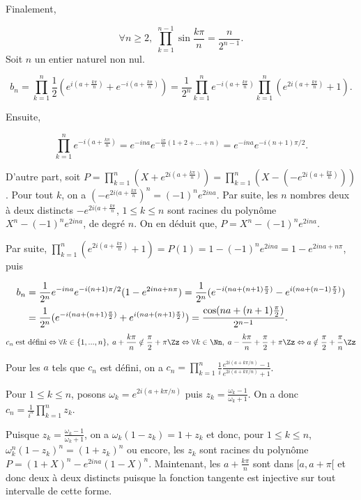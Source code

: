 {{Finalement,

$$\forall n\geq2,\;\prod_{k=1}^{n-1}\sin\frac{k\pi}{n}=\frac{n}{2^{n-1}}.$$
Soit $n$ un entier naturel non nul.

$$b_n=\prod_{k=1}^{n}\frac{1}{2}(e^{i(a+\frac{k\pi}{n})}+e^{-i(a+\frac{k\pi}{n})})=\frac{1}{2^n}\prod_{k=1}^{n}e^{-i(a+\frac{k\pi}{n})}\prod_{k=1}^{n}(e^{2i(a+\frac{k\pi}{n})}+1).$$

Ensuite, 

$$\prod_{k=1}^{n}e^{-i(a+\frac{k\pi}{n})}=e^{-ina}e^{-\frac{i\pi}{n}(1+2+...+n)}=e^{-ina}e^{-i(n+1)\pi/2}.$$

D'autre part, soit $P=\prod_{k=1}^{n}(X+e^{2i(a+\frac{k\pi}{n})})=\prod_{k=1}^{n}(X-(-e^{2i(a+\frac{k\pi}{n})}))$.
Pour tout $k$, on a $(-e^{2i(a+\frac{k\pi}{n}})^n=(-1)^ne^{2ina}$. Par suite, les $n$ nombres deux à deux distincts $-e^{2i(a+\frac{k\pi}{n}}$, $1\leq k\leq n$ sont racines du polynôme $X^n-(-1)^ne^{2ina}$, de degré $n$. On en déduit que, $P=X^n-(-1)^ne^{2ina}$.

Par suite, $\prod_{k=1}^{n}(e^{2i(a+\frac{k\pi}{n})}+1)=P(1)=1-(-1)^ne^{2ina}=1-e^{2ina+n\pi}$, puis 

\begin{align*}\ensuremath
b_n&=\frac{1}{2^n}e^{-ina}e^{-i(n+1)\pi/2}(1-e^{2ina+n\pi})=\frac{1}{2^n}(e^{-i(na+(n+1)\frac{\pi}{2})}-e^{i(na+(n-1)\frac{\pi}{2})})\\
 &=\frac{1}{2^n}(e^{-i(na+(n+1)\frac{\pi}{2})}+e^{i(na+(n+1)\frac{\pi}{2})})=\frac{\cos(na+(n+1)\frac{\pi}{2})}{2^{n-1}}.
\end{align*}
\begin{align*}\ensuremath
c_n\;\mbox{est défini}\Leftrightarrow\forall k\in\{1,...,n\},\;a+\frac{k\pi}{n}\notin\frac{\pi}{2}+\pi\Zz\Leftrightarrow\forall k\in\Nn,\;a-\frac{k\pi}{n}+\frac{\pi}{2}+\pi\Zz\Leftrightarrow a\notin\frac{\pi}{2}+\frac{\pi}{n}\Zz
\end{align*}

Pour les $a$ tels que $c_n$ est défini, on a $c_n=\prod_{k=1}^{n}\frac{1}{i}\frac{e^{2i(a+k\pi/n)}-1}{e^{2i(a+k\pi/n)}+1}$.

Pour $1\leq k\leq n$, posons $\omega_k=e^{2i(a+k\pi/n)}$ puis $z_k=\frac{\omega_k-1}{\omega_k+1}$. On a donc $c_n=\frac{1}{i^n}\prod_{k=1}^{n}z_k$.

Puisque $z_k=\frac{\omega_k-1}{\omega_k+1}$, on a $\omega_k(1-z_k)=1+z_k$ et donc, pour $1\leq k\leq n$, $\omega_k^n(1-z_k)^n=(1+z_k)^n$ ou encore, les $z_k$ sont racines du polynôme $P=(1+X)^n-e^{2ina}(1-X)^n$. Maintenant, les $a+\frac{k\pi}{n}$ sont dans $[a,a+\pi[$ et donc deux à deux distincts puisque la fonction tangente est injective sur tout intervalle de cette forme.

}}
